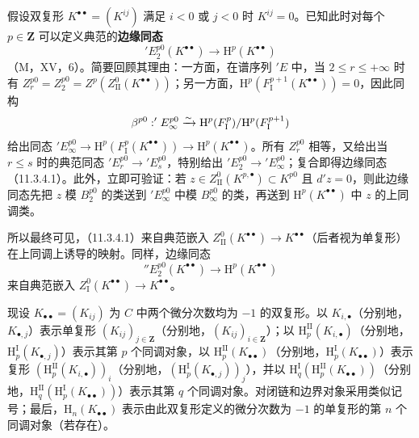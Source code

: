 假设双复形 $K^{\bullet\bullet}=(K^{ij})$ 满足 $i<0$ 或 $j<0$ 时 $K^{ij}=0$。已知此时对每个 $p\in\mathbf Z$ 可以定义典范的\textbf{边缘同态}
\begin{equation}\tag{11.3.4.1}
'E_2^{p0}(K^{\bullet\bullet})\longrightarrow\mathrm H^p(K^{\bullet\bullet})
\end{equation}
（M，XV，6）。简要回顾其理由：一方面，在谱序列 $'E$ 中，当 $2\leq r\leq+\infty$ 时有 $Z_r^{p0}=Z_2^{p0}=Z^p(Z_{\mathrm{II}}^0(K^{\bullet\bullet}))$；另一方面，$\mathrm H^p(F_{
\mathrm I}^{p+1}(K^{\bullet\bullet}))=0$，因此同构
\[
\beta^{p0}:'E_\infty^{p0}\xrightarrow{\sim}\mathrm H^p(F_{\mathrm I}^p)/\mathrm H^p(F_{\mathrm I}^{p+1})
\]
给出同态 $'E_\infty^{p0}\to\mathrm H^p(F_{\mathrm I}^p(K^{\bullet\bullet}))\to\mathrm H^p(K^{\bullet\bullet})$。所有 $Z_r^{p0}$ 相等，又给出当 $r\leq s$ 时的典范同态 $'E_r^{p0}\to'E_s^{p0}$，特别给出 $'E_2^{p0}\to'E_\infty^{p0}$；复合即得边缘同态（11.3.4.1）。此外，立即可验证：若 $z\in Z_{\mathrm{II}}^0(K^{p,\bullet})\subset K^{p0}$ 且 $d'z=0$，则此边缘同态先把 $z$ 模 $B_2^{p0}$ 的类送到 $'E_\infty^{p0}$ 中模 $B_\infty^{p0}$ 的类，再送到 $\mathrm H^p(K^{\bullet\bullet})$ 中 $z$ 的上同调类。

所以最终可见，（11.3.4.1）来自典范嵌入 $Z_{\mathrm{II}}^0(K^{\bullet\bullet})\to K^{\bullet\bullet}$（后者视为单复形）在上同调上诱导的映射。同样，边缘同态
\begin{equation}\tag{11.3.4.2}
''E_2^{p0}(K^{\bullet\bullet})\longrightarrow\mathrm H^p(K^{\bullet\bullet})
\end{equation}
来自典范嵌入 $Z_{\mathrm I}^0(K^{\bullet\bullet})\to K^{\bullet\bullet}$。

现设 $K_{\bullet\bullet}=(K_{ij})$ 为 $C$ 中两个微分次数均为 $-1$ 的双复形。以 $K_{i,\bullet}$（分别地，$K_{\bullet,j}$）表示单复形 $(K_{ij})_{j\in\mathbf Z}$（分别地，$(K_{ij})_{i\in\mathbf Z}$）；以 $\mathrm H_p^{\mathrm{II}}(K_{i,\bullet})$（分别地，$\mathrm H_p^{\mathrm I}(K_{\bullet,j})$）表示其第 $p$ 个同调对象，以 $\mathrm H_p^{\mathrm{II}}(K_{\bullet\bullet})$（分别地，$\mathrm H_p^{\mathrm I}(K_{\bullet\bullet})$）表示复形 $(\mathrm H_p^{\mathrm{II}}(K_{i,\bullet}))_i$（分别地，$(\mathrm H_p^{\mathrm I}(K_{\bullet,j}))_j$），并以 $\mathrm H_q^{\mathrm I}(\mathrm H_p^{\mathrm{II}}(K_{\bullet\bullet}))$（分别地，$\mathrm H_q^{\mathrm{II}}(\mathrm H_p^{\mathrm I}(K_{\bullet\bullet}))$）表示其第 $q$ 个同调对象。对闭链和边界对象采用类似记号；最后，$\mathrm H_n(K_{\bullet\bullet})$ 表示由此双复形定义的微分次数为 $-1$ 的单复形的第 $n$ 个同调对象（若存在）。

